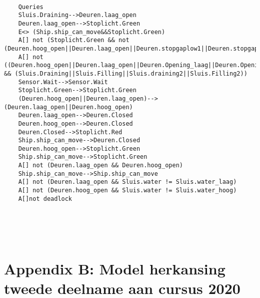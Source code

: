  
 \begin{verbatim}
 	
 	Queries
 	Sluis.Draining-->Deuren.laag_open
 	Deuren.laag_open-->Stoplicht.Green
 	E<> (Ship.ship_can_move&&Stoplicht.Green)
 	A[] not (Stoplicht.Green && not (Deuren.hoog_open||Deuren.laag_open||Deuren.stopgaplow1||Deuren.stopgaplow2||Deuren.stopgaphigh1||Deuren.stopgaphigh2))
 	A[] not ((Deuren.hoog_open||Deuren.laag_open||Deuren.Opening_laag||Deuren.Opening_hoog||Deuren.Closing_hoog||Deuren.Closing_laag) && (Sluis.Draining||Sluis.Filling||Sluis.draining2||Sluis.Filling2))
 	Sensor.Wait-->Sensor.Wait
 	Stoplicht.Green-->Stoplicht.Green
 	(Deuren.hoog_open||Deuren.laag_open)-->(Deuren.laag_open||Deuren.hoog_open)
 	Deuren.laag_open-->Deuren.Closed
 	Deuren.hoog_open-->Deuren.Closed
 	Deuren.Closed-->Stoplicht.Red
 	Ship.ship_can_move-->Deuren.Closed
 	Deuren.hoog_open-->Stoplicht.Green
 	Ship.ship_can_move-->Stoplicht.Green
 	A[] not (Deuren.laag_open && Deuren.hoog_open)
 	Ship.ship_can_move-->Ship.ship_can_move
 	A[] not (Deuren.laag_open && Sluis.water != Sluis.water_laag)
 	A[] not (Deuren.hoog_open && Sluis.water != Sluis.water_hoog)
 	A[]not deadlock
 	
	
 \end{verbatim}
 
 \newpage
 \section{\\ Appendix B: Model herkansing tweede deelname aan cursus 2020}
 

